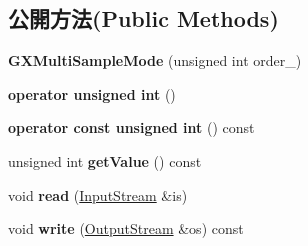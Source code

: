 \subsection*{公開方法(Public Methods)}
\begin{DoxyCompactItemize}
\item 
{\bfseries G\+X\+Multi\+Sample\+Mode} (unsigned int order\+\_)\hypertarget{class_magnum_1_1_g_x_multi_sample_mode_a5a43fc8662381224467f4ffb3b191c56}{}\label{class_magnum_1_1_g_x_multi_sample_mode_a5a43fc8662381224467f4ffb3b191c56}

\item 
{\bfseries operator unsigned int} ()\hypertarget{class_magnum_1_1_g_x_multi_sample_mode_a630b00b38238160c6655d6b1a8f70fd3}{}\label{class_magnum_1_1_g_x_multi_sample_mode_a630b00b38238160c6655d6b1a8f70fd3}

\item 
{\bfseries operator const unsigned int} () const \hypertarget{class_magnum_1_1_g_x_multi_sample_mode_aa5e29866d1dfc90b84bd56c03c93a1b0}{}\label{class_magnum_1_1_g_x_multi_sample_mode_aa5e29866d1dfc90b84bd56c03c93a1b0}

\item 
unsigned int {\bfseries get\+Value} () const \hypertarget{class_magnum_1_1_g_x_multi_sample_mode_a6f3be3c8f94f07b3ae3ab1682162f899}{}\label{class_magnum_1_1_g_x_multi_sample_mode_a6f3be3c8f94f07b3ae3ab1682162f899}

\item 
void {\bfseries read} (\hyperlink{class_magnum_1_1_input_stream}{Input\+Stream} \&is)\hypertarget{class_magnum_1_1_g_x_multi_sample_mode_a6ee756ed5e3c576b123fdff0b09cde9b}{}\label{class_magnum_1_1_g_x_multi_sample_mode_a6ee756ed5e3c576b123fdff0b09cde9b}

\item 
void {\bfseries write} (\hyperlink{class_magnum_1_1_output_stream}{Output\+Stream} \&os) const \hypertarget{class_magnum_1_1_g_x_multi_sample_mode_ab419b91db876b17930053565ffb6be35}{}\label{class_magnum_1_1_g_x_multi_sample_mode_ab419b91db876b17930053565ffb6be35}

\end{DoxyCompactItemize}
